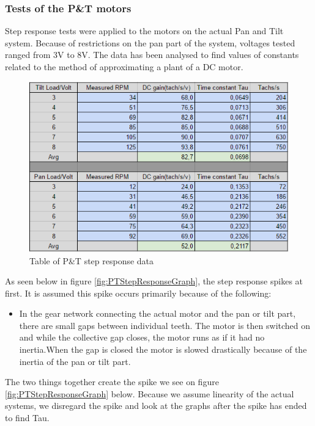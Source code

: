 \subsubsection{Tests of the P\&T motors}
Step response tests were applied to the motors on the actual Pan and Tilt system. Because of restrictions on the pan part of the system, voltages tested ranged from 3V to 8V. The data has been analysed to find values of constants related to the method of approximating a plant of a DC motor.

\begin{figure}[h!]
\centering
\includegraphics[scale=0.6]{Billeder/PanTiltStepDataTable.png}
\caption{Table of P\&T step response data}
\label{fig:PanTiltStepDataTable}
\end{figure}

As seen below in figure \ref{fig:PTStepResponseGraph}, the step response spikes at first. It is assumed this spike occurs primarily because of the following:

\begin{itemize}
\item In the gear network connecting the actual motor and the pan or tilt part, there are small gaps between individual teeth. The motor is then switched on and while the collective gap closes, the motor runs as if it had no inertia.When the gap is closed the motor is slowed drastically because of the inertia of the pan or tilt part. 
\end{itemize}

The two things together create the spike we see on figure \ref{fig:PTStepResponseGraph} below. Because we assume linearity of the actual systems, we disregard the spike and look at the graphs after the spike has ended to find Tau.

